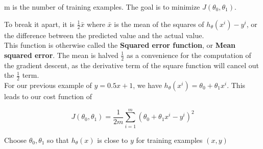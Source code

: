 m is the number of training examples. The goal is to minimize $J(\theta_{0}, \theta_{1})$.

To break it apart, it is $\frac{1}{2} \bar{x}$ where $\bar{x}$ is the mean of the squares of $h_{\theta}(x^{i}) -y^{i}$, or the difference between the predicted value and the actual value.\\

This function is otherwise called the \textbf{Squared error function}, or \textbf{Mean squared error}. The mean is halved $\frac{1}{2}$ as a convenience for the computation of the gradient descent, as the derivative term of the square function will cancel out the $\frac{1}{2}$ term. \\

For our previous example of $y=0.5x + 1$, we have $h_{\theta}(x^{i}) = \theta_{0} + \theta_{1}x^{i}$.  This leads to our cost function of 

\begin{equation}
J(\theta_{0}, \theta_{1}) = \frac{1}{2m} \sum_{i=1}^{m} (\theta_{0} + \theta_{1}x^{i} - y^{i})^{2} 
\end{equation}

Choose $\theta_{0}, \theta_{1}$ so that $h_{\theta}(x)$ is close to $y$ for training examples $(x,y)$\\
